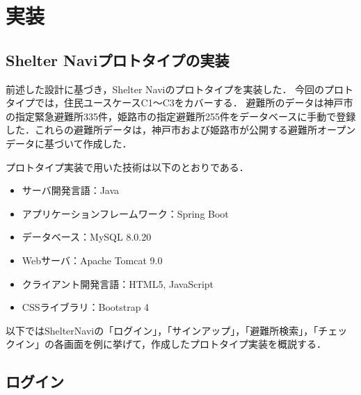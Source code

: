 \documentclass[technicalreport,dvipdfmx]{ieicej}
\begin{document}

\section{実装}
\subsection{Shelter Naviプロトタイプの実装}
前述した設計に基づき，Shelter Naviのプロトタイプを実装した．
今回のプロトタイプでは，住民ユースケースC1～C3をカバーする．
避難所のデータは神戸市の指定緊急避難所335件，姫路市の指定避難所255件をデータベースに手動で登録した．これらの避難所データは，神戸市\cite{kobe_open_data}および姫路市\cite{himeji_open_data}が公開する避難所オープンデータに基づいて作成した．

プロトタイプ実装で用いた技術は以下のとおりである．
\begin{itemize}
    \item サーバ開発言語：Java
    \item アプリケーションフレームワーク：Spring Boot
    \item データベース：MySQL 8.0.20
    \item Webサーバ：Apache Tomcat 9.0
    \item クライアント開発言語：HTML5, JavaScript
    \item CSSライブラリ：Bootstrap 4
\end{itemize}

以下ではShelterNaviの「ログイン」，「サインアップ」，「避難所検索」，「チェックイン」の各画面を例に挙げて，作成したプロトタイプ実装を概説する．


\subsection{ログイン}
\end{document}
